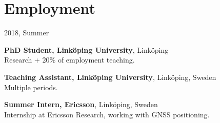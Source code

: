 \section*{Employment}
\begin{labeling}{2018, Summer}
    \item [2020 --]\textbf{PhD Student, Linköping University}, Linköping\\
        Research + 20\% of employment teaching.
    \item [2016--2019] \textbf{Teaching Assistant, Linköping University}, Linköping, Sweden\\
        Multiple periods.

    \item [2018, Summer] \textbf{Summer Intern, Ericsson}, Linköping, Sweden\\
        Internship at Ericsson Research, working with GNSS positioning.
\end{labeling}
